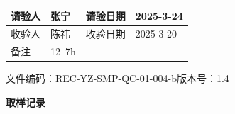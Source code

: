 \documentclass[UTF8,10pt,a4paper,fontset=fandol]{ctexart}
\newcommand{\fieldvalue}[1]{#1}
\newcommand{\handwritten}[1]{#1}
\begin{document}
\begin{tabularx}{\textwidth}{|p{2.4cm}|X|p{2.8cm}|X|}
请验人 &
\fieldvalue{\handwritten{张宁}} &
请验日期 &
\fieldvalue{\handwritten{2025-3-24}}
\\ \hline

收验人 &
\fieldvalue{\handwritten{陈祎}} &
收验日期 &
\fieldvalue{\handwritten{2025-3-20}}
\\ \hline

备注 &
\fieldvalue{\handwritten{12\ 7h}} &
\multicolumn{2}{l|}{}
\\ \hline
\end{tabularx}

\newpage

\begin{center}
文件编码：REC-YZ-SMP-QC-01-004-b\qquad 版本号：1.4

\vspace{0.5em}
{\large\textbf{取样记录}}
\end{center}
\end{document}
